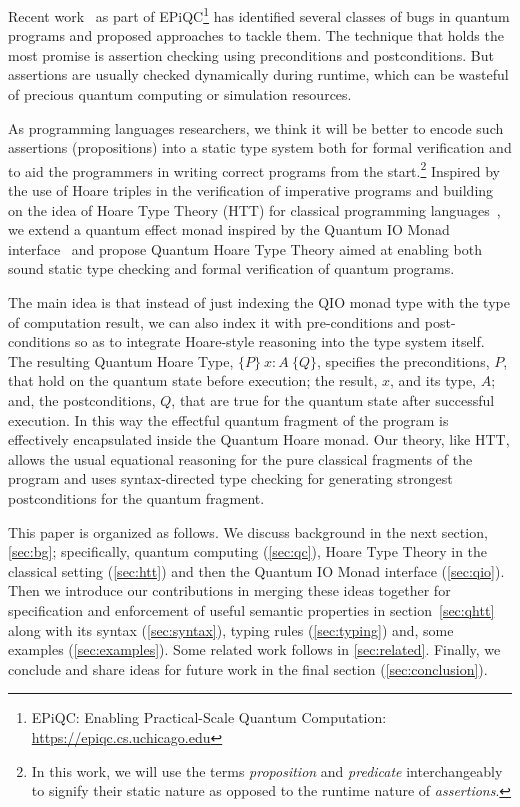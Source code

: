 \documentclass[acmsmall,nonacm,timestamp,review=false,anonymous=false]{acmart}
\begin{document}
Recent work~\cite{huang_qdb:_2018,huang_statistical_2019} as part of EPiQC\footnote{EPiQC: Enabling Practical-Scale Quantum Computation:  \url{https://epiqc.cs.uchicago.edu}} has identified several classes of bugs in quantum programs and proposed approaches to tackle them. The technique that holds the most promise is assertion checking using preconditions and postconditions. But assertions are usually checked dynamically during runtime, which can be wasteful of precious quantum computing or simulation resources.

As programming languages researchers, we think it will be better to encode such assertions (propositions) into a static type system both for formal verification and to aid the programmers in writing correct programs from the start.\footnote{In this work, we will use the terms \textit{proposition} and \textit{predicate} interchangeably to signify their static nature as opposed to the runtime nature of \textit{assertions}.} Inspired by the use of Hoare triples in the verification of imperative programs and building on the idea of Hoare Type Theory (HTT) for classical programming languages~\cite{nanevski_hoare_2008}, we extend a quantum effect monad inspired by the Quantum IO Monad interface~\cite{qio} and propose Quantum Hoare Type Theory aimed at enabling both sound static type checking and formal verification of quantum programs.

The main idea is that instead of just indexing the QIO monad type with the type of computation result, we can also index it with pre-conditions and post-conditions so as to integrate Hoare-style reasoning into the type system itself. The resulting Quantum Hoare Type, $\{P\}\ x{ : }A\ \{Q\}$, specifies the preconditions, $P$, that hold on the quantum state before execution; the result, $x$, and its type, $A$; and, the postconditions, $Q$, that are true for the quantum state after successful execution. In this way the effectful quantum fragment of the program is effectively encapsulated inside the Quantum Hoare monad. Our theory, like HTT, allows the usual equational reasoning for the pure classical fragments of the program and uses syntax-directed type checking for generating strongest postconditions for the quantum fragment.

This paper is organized as follows. We discuss background in the next section, \cref{sec:bg}; specifically, quantum computing (\cref{sec:qc}),  Hoare Type Theory in the classical setting (\cref{sec:htt}) and then the Quantum IO Monad interface (\cref{sec:qio}). Then we introduce our contributions in merging these ideas together for specification and enforcement of useful semantic properties in section~\cref{sec:qhtt} along with its syntax (\cref{sec:syntax}), typing rules (\cref{sec:typing}) and, some examples (\cref{sec:examples}). Some related work follows in \cref{sec:related}. Finally, we conclude and share ideas for future work in the final section (\cref{sec:conclusion}).
\end{document}
